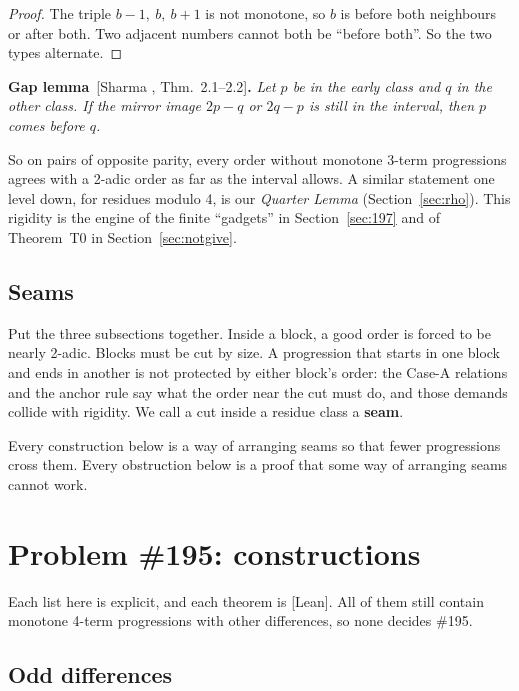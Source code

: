 \documentclass[11pt,letterpaper]{article}
\newcommand{\st}[1]{\textnormal{\textsf{\small[#1]}}}
\newenvironment{result}[2]%
  {\par\medskip\noindent\textbf{#1}\ \st{#2}\textbf{.}\enspace\itshape}%
  {\par\medskip}
\begin{document}
\begin{proof}
The triple $b-1,\ b,\ b+1$ is not monotone, so $b$ is before both neighbours or after both. Two adjacent
numbers cannot both be ``before both''. So the two types alternate.
\end{proof}

\begin{result}{Gap lemma}{Sharma \cite{Sharma}, Thm.~2.1--2.2}
Let $p$ be in the early class and $q$ in the other class. If the mirror image $2p-q$ or $2q-p$ is still in
the interval, then $p$ comes before $q$.
\end{result}

So on pairs of opposite parity, every order without monotone 3-term progressions agrees with a 2-adic order
as far as the interval allows. A similar statement one level down, for residues modulo 4, is our
\emph{Quarter Lemma} (Section~\ref{sec:rho}). This rigidity is the engine of the finite ``gadgets'' in
Section~\ref{sec:197} and of Theorem~T0 in Section~\ref{sec:notgive}.

\subsection{Seams}

Put the three subsections together. Inside a block, a good order is forced to be nearly 2-adic. Blocks must
be cut by size. A progression that starts in one block and ends in another is not protected by either
block's order: the Case-A relations and the anchor rule say what the order near the cut must do, and those
demands collide with rigidity. We call a cut inside a residue class a \textbf{seam}.

Every construction below is a way of arranging seams so that fewer progressions cross them. Every
obstruction below is a proof that some way of arranging seams cannot work.

\section{Problem \#195: constructions}\label{sec:195c}

Each list here is explicit, and each theorem is \st{Lean}. All of them still contain monotone 4-term
progressions with other differences, so none decides \#195.

\subsection{Odd differences}
\end{document}

